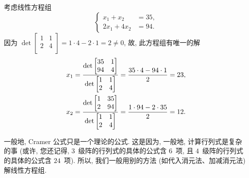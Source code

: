 \documentclass[../libro.tex]{subfiles}
\begin{document}
\begin{example}
    考虑线性方程组
    \begin{equation*}
        \left\{ %
        \begin{aligned}
            x_1 + x_2   & = 35, \\
            2x_1 + 4x_2 & = 94.
        \end{aligned}
        \right. %
    \end{equation*}
    因为
    \(\det {
            \begin{bmatrix}
                1 & 1 \\
                2 & 4 \\
            \end{bmatrix}
        }
    = 1 \cdot 4 - 2 \cdot 1 = 2 \neq 0\),
    故,
    此方程组有唯一的解
    \begin{align*}
        x_1
        = \frac{\det {
                \begin{bmatrix}
                    35 & 1 \\
                    94 & 4 \\
                \end{bmatrix}
        }}{\det {
                \begin{bmatrix}
                    1 & 1 \\
                    2 & 4 \\
                \end{bmatrix}
        }}
        = \frac{35 \cdot 4 - 94 \cdot 1}{2} = 23,
        \\
        x_2
        = \frac{\det {
                \begin{bmatrix}
                    1 & 35 \\
                    2 & 94 \\
                \end{bmatrix}
        }}{\det {
                \begin{bmatrix}
                    1 & 1 \\
                    2 & 4 \\
                \end{bmatrix}
        }}
        = \frac{1 \cdot 94 - 2 \cdot 35}{2} = 12.
        \qedhere
    \end{align*}
\end{example}

一般地, Cramer 公式只是一个理论的公式.
这是因为, 一般地, 计算行列式是复杂的事
(或许, 您还记得, %
\(3\)~级阵的行列式的具体的公式含 \(6\)~项,
且 \(4\)~级阵的行列式的具体的公式含 \(24\)~项). %
所以, 我们一般用别的方法
(如代入消元法、加减消元法)
解线性方程组.
\end{document}
